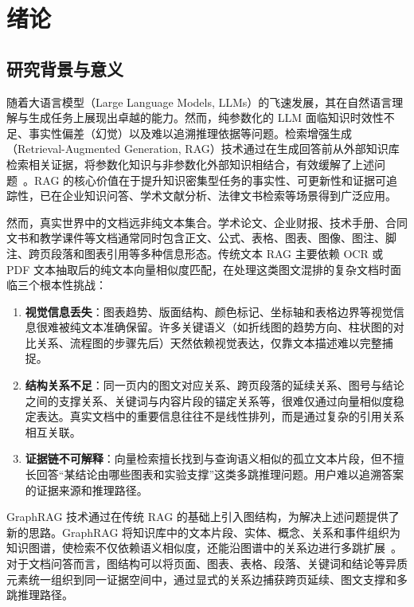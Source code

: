 
\chapter{绪论}\label{ch:intro}

\section{研究背景与意义}\label{sec:background}

随着大语言模型（Large Language Models, LLMs）的飞速发展，其在自然语言理解与生成任务上展现出卓越的能力。然而，纯参数化的 LLM 面临知识时效性不足、事实性偏差（幻觉）以及难以追溯推理依据等问题。检索增强生成（Retrieval-Augmented Generation, RAG）技术通过在生成回答前从外部知识库检索相关证据，将参数化知识与非参数化外部知识相结合，有效缓解了上述问题~\cite{lewis2020rag}。RAG 的核心价值在于提升知识密集型任务的事实性、可更新性和证据可追踪性，已在企业知识问答、学术文献分析、法律文书检索等场景得到广泛应用。

然而，真实世界中的文档远非纯文本集合。学术论文、企业财报、技术手册、合同文书和教学课件等文档通常同时包含正文、公式、表格、图表、图像、图注、脚注、跨页段落和图表引用等多种信息形态。传统文本 RAG 主要依赖 OCR 或 PDF 文本抽取后的纯文本向量相似度匹配，在处理这类图文混排的复杂文档时面临三个根本性挑战：

\begin{enumerate}[label=（\arabic*）]
\item \textbf{视觉信息丢失}：图表趋势、版面结构、颜色标记、坐标轴和表格边界等视觉信息很难被纯文本准确保留。许多关键语义（如折线图的趋势方向、柱状图的对比关系、流程图的步骤先后）天然依赖视觉表达，仅靠文本描述难以完整捕捉。
\item \textbf{结构关系不足}：同一页内的图文对应关系、跨页段落的延续关系、图号与结论之间的支撑关系、关键词与内容片段的锚定关系等，很难仅通过向量相似度稳定表达。真实文档中的重要信息往往不是线性排列，而是通过复杂的引用关系相互关联。
\item \textbf{证据链不可解释}：向量检索擅长找到与查询语义相似的孤立文本片段，但不擅长回答``某结论由哪些图表和实验支撑''这类多跳推理问题。用户难以追溯答案的证据来源和推理路径。
\end{enumerate}

GraphRAG 技术通过在传统 RAG 的基础上引入图结构，为解决上述问题提供了新的思路。GraphRAG 将知识库中的文本片段、实体、概念、关系和事件组织为知识图谱，使检索不仅依赖语义相似度，还能沿图谱中的关系边进行多跳扩展~\cite{edge2024graphrag}。对于文档问答而言，图结构可以将页面、图表、表格、段落、关键词和结论等异质元素统一组织到同一证据空间中，通过显式的关系边捕获跨页延续、图文支撑和多跳推理路径。

